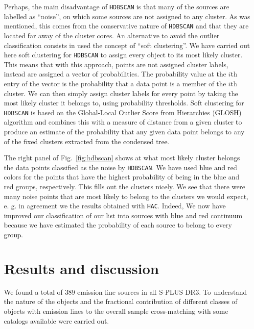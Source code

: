 \documentclass[fleqn,usenatbib]{mnras}
\begin{document}
Perhaps, the main disadvantage of \texttt{HDBSCAN} is that many of the sources are labelled
as ``noise'', on which some sources are not assigned to any cluster. As was mentioned,
this comes from the conservative nature of \texttt{HDBSCAN}
and that they are located far away of the cluster cores. An alternative to avoid the outlier
classification consists in used the concept of ``soft clustering''. We have carried out here soft
clustering for \texttt{HDBSCAN} to assign every object to its most likely cluster.
This means that with this approach, points are not assigned cluster labels, instead are
assigned a vector of probabilities. The probability value at the $i$th entry of the vector
is the probability that a data point is a member of the $i$th cluster. We can then simply
assign cluster labels for every point by taking the most likely cluster it belongs to,
using probability thresholds. Soft clustering for \texttt{HDBSCAN} is based on the
Global-Local Outlier Score from Hierarchies (GLOSH) algorithm \citep{Campello:2015}
and combines this with a
measure of distance from a given cluster to produce an estimate of the probability that any
given data point belongs to any of the fixed clusters extracted from the
condensed tree.

The right panel of Fig.~\ref{fig:hdbscan} shows at what most likely cluster belongs the data
points classified as the noise by \texttt{HDBSCAN}. We have used blue and red colors for the
points that have the highest probability of being in the blue and red groups, respectively.
This fills out the clusters nicely. We see that there were many noise points that are most
likely to belong to the clusters we would expect, e. g. in agreement we the results obtained
with \texttt{HAC}. Indeed, We now have improved our classification of our list into sources
with blue and red continuum because we have estimated the probability of each source to belong
to every group.

\section{Results and discussion}
\label{sec:results}

We found a total of 389 emission line sources in all S-PLUS DR3.
To understand the nature of the objects  and the fractional
contribution of different classes
of objects with emission lines to the overall sample cross-matching
with some catalogs available were carried out.
\end{document}
